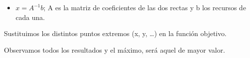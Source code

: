 \documentclass[12pt, twoside, openright]{report} %
\begin{document}
\begin{itemize}
\begin{itemize}
\begin{eqnarray*}
\begin{matrix}
					\begin{pmatrix}
					-8 \\ 
					18
					\end{pmatrix}\end{matrix}\right.
			  \end{eqnarray*}
			  \item
			  \(x= A^{-1}b\); A es la matriz de coeficientes de las dos rectas
			  y b los recursos de cada una.
		  \end{itemize}
		 
	  \end{itemize}


	  Sustituimos los distintos puntos extremos (x, y, \ldots) en la
      función objetivo.

	
  Observamos todos los resultados y el máximo, será aquel de mayor
  valor.
\end{document}
